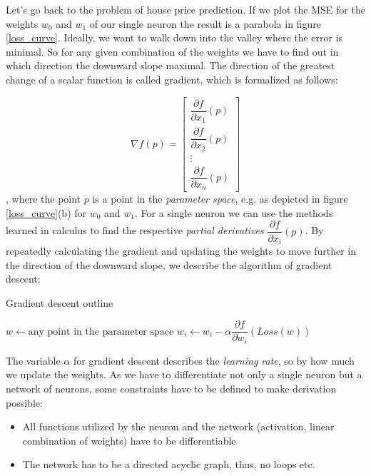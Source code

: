 Let's go back to the problem of house price prediction. If we plot the MSE for the weights $ w_0 $ and $ w_1 $ of our single neuron the result is a parabola in figure \ref{loss_curve}. Ideally, we want to walk down into the valley where the error is minimal. So for any given combination of the weights we have to find out in which direction the downward slope maximal. The direction of the greatest change of a scalar function is called gradient, which is formalized as follows:

$$
    \nabla f(p)=\left[\begin{array}{c}
            \dfrac{\partial f}{\partial x_1}(p) \\
            \dfrac{\partial f}{\partial x_2}(p) \\
            \vdots                              \\
            \dfrac{\partial f}{\partial x_n}(p)
        \end{array}\right]
$$,
where the point $p $ is a point in the \textit{parameter space}, e.g. as depicted in figure \ref{loss_curve}(b) for $w_0 $ and $ w_1 $. For a single neuron we can use the methods learned in calculus to find the respective \textit{partial derivatives} $  \dfrac{\partial f}{\partial x_i}(p) $. By repeatedly calculating the gradient and updating the weights to move further in the direction of the downward slope, we describe the algorithm of gradient descent:

\begin{algorithm}
    \caption{Gradient descent outline \cite[p. 1253]{russell_artificial_2021}}\label{alg:gradient_descent}
    \begin{algorithmic}
        \State $w \gets \text{any point in the parameter space}$
        \State $w_i \gets w_i - \alpha \dfrac{\partial f}{\partial w_i}(Loss(w))$
        \EndFor
        \EndWhile
    \end{algorithmic}
\end{algorithm}

The variable $ \alpha $ for gradient descent describes the \textit{learning rate}, so by how much we update the weights. As we have to differentiate not only a single neuron but a network of neurons, some constraints have to be defined to make derivation possible:

\begin{itemize}
    \item All functions utilized by the neuron and the network (activation, linear combination of weights) have to be differentiable
    \item The network has to be a directed acyclic graph, thus, no loops etc.
\end{itemize}

